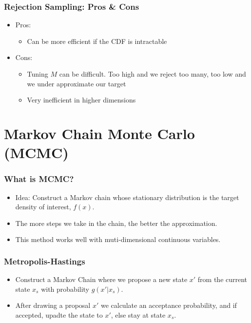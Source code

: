 \documentclass{beamer}
\begin{document}
\begin{frame}
  \frametitle{Rejection Sampling: Pros \& Cons}
  \begin{itemize}
    \item Pros:
    \begin{itemize}
      \item Can be more efficient if the CDF is intractable
    \end{itemize}
    \item Cons:
    \begin{itemize}
      \item Tuning $M$ can be difficult. Too high and we reject too many, too low and
      we under approximate our target
      \item Very inefficient in higher dimensions
    \end{itemize}
  \end{itemize}
\end{frame}


\section{Markov Chain Monte Carlo (MCMC)}
\begin{frame}
\frametitle{What is MCMC?}
\begin{itemize}
  \item Idea: Construct a Markov chain whose stationary distribution is the
  target density of interest, $f(x)$.
  \item The more steps we take in the chain, the better the approximation.
  \item This method works well with muti-dimensional continuous variables.
\end{itemize}
\end{frame}


\begin{frame}
\frametitle{Metropolis-Hastings}
\begin{itemize}
  \item Construct a Markov Chain where we propose a new state $x'$ from the
  current state $x_s$ with probability $g(x'|x_s)$.
  \item After drawing a proposal $x'$ we calculate an acceptance probability, and
  if accepted, upadte the state to $x'$, else stay at state $x_s$.
\end{itemize}
\end{frame}
\end{document}
